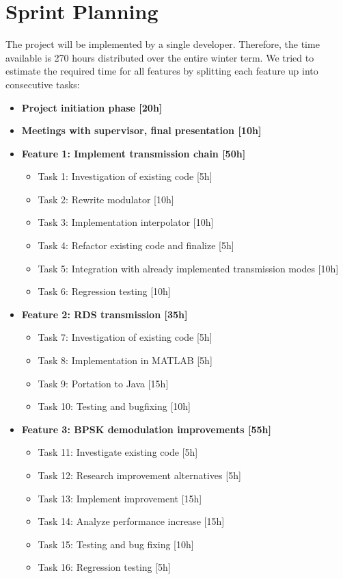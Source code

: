 \section{Sprint Planning}
The project will be implemented by a single developer. Therefore, the time available is 270 hours distributed over the entire winter term. We tried to estimate the required time for all features by splitting each feature up into consecutive tasks:
\begin{itemize}
\item \textbf{Project initiation phase [20h]}
\item \textbf{Meetings with supervisor, final presentation [10h]}
\item \textbf{Feature 1: Implement transmission chain [50h]}
\begin{itemize}
\item Task 1: Investigation of existing code [5h] 
\item Task 2: Rewrite modulator [10h]
\item Task 3: Implementation interpolator [10h]
\item Task 4: Refactor existing code and finalize [5h]
\item Task 5: Integration with already implemented transmission modes [10h]
\item Task 6: Regression testing [10h]
\end{itemize}
\item \textbf{Feature 2: \ac{RDS} transmission [35h]}
\begin{itemize}
\item Task 7: Investigation of existing code [5h]
\item Task 8: Implementation in MATLAB [5h]
\item Task 9: Portation to Java [15h]
\item Task 10: Testing and bugfixing [10h]
\end{itemize}
\item \textbf{Feature 3: \ac{BPSK} demodulation improvements [55h]}
\begin{itemize}
\item Task 11: Investigate existing code [5h]
\item Task 12: Research improvement alternatives [5h]
\item Task 13: Implement improvement [15h]
\item Task 14: Analyze performance increase [15h]
\item Task 15: Testing and bug fixing [10h]
\item Task 16: Regression testing [5h]

\end{itemize}
\end{itemize}
